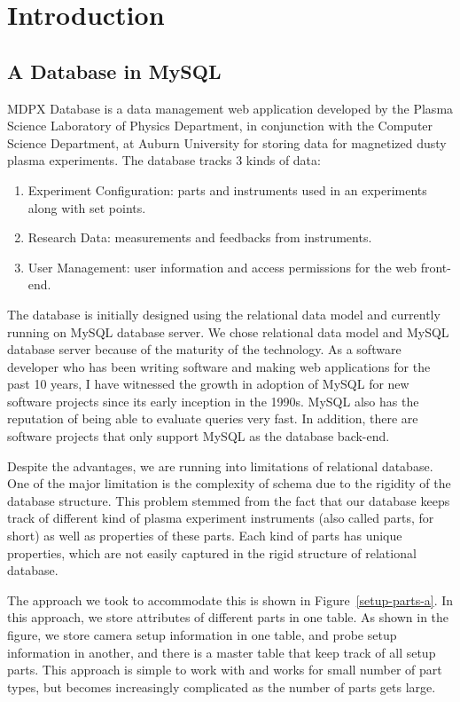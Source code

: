 \section{Introduction}

\subsection{A Database in MySQL}

MDPX Database is a data management web application developed by the Plasma Science Laboratory of Physics Department, in conjunction with the Computer Science Department, at Auburn University for storing data for magnetized dusty plasma experiments. The database tracks 3 kinds of data:

\begin{enumerate}
\item Experiment Configuration: parts and instruments used in an experiments along with set points.
\item Research Data: measurements and feedbacks from instruments.
\item User Management: user information and access permissions for the web front-end.
\end{enumerate}

The database is initially designed using the relational data model and currently running on MySQL database server. We chose relational data model and MySQL database server because of the maturity of the technology. As a software developer who has been writing software and making web applications for the past 10 years, I have witnessed the growth in adoption of MySQL for new software projects since its early inception in the 1990s. MySQL also has the reputation of being able to evaluate queries very fast. In addition, there are software projects that only support MySQL as the database back-end.

Despite the advantages, we are running into limitations of relational database. One of the major limitation is the complexity of schema due to the rigidity of the database structure. This problem stemmed from the fact that our database keeps track of different kind of plasma experiment instruments (also called parts, for short) as well as properties of these parts. Each kind of parts has unique properties, which are not easily captured in the rigid structure of relational database.

The approach we took to accommodate this is shown in Figure~\ref{setup-parts-a}. In this approach, we store attributes of different parts in one table. As shown in the figure, we store camera setup information in one table, and probe setup information in another, and there is a master table that keep track of all setup parts. This approach is simple to work with and works for small number of part types, but becomes increasingly complicated as the number of parts gets large.

